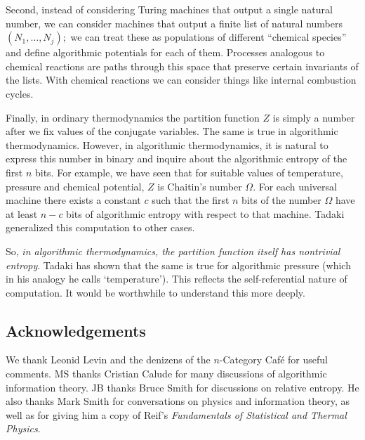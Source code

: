 \documentclass{article}
\begin{document}
Second, instead of considering Turing machines that output
a single natural number, we can consider machines that output a finite
list of natural numbers $(N_1, \ldots, N_j);$ we can treat these as
populations of different ``chemical species'' and define
algorithmic potentials for each of them.  Processes analogous to 
chemical reactions are paths through this space that preserve 
certain invariants of the lists.  With chemical reactions we can
consider things like internal combustion cycles.

Finally, in ordinary thermodynamics the partition function $Z$ is
simply a number after we fix values of the conjugate variables.  The
same is true in algorithmic thermodynamics.  However, in algorithmic
thermodynamics, it is natural to express this number in binary
and inquire about the algorithmic entropy of the first $n$ bits.  For
example, we have seen that for suitable values of temperature, 
pressure and chemical potential, $Z$ is Chaitin's number $\Omega$.  
For each universal machine there exists a constant $c$ such 
that the first $n$ bits of the number $\Omega$ have at least 
$n - c$ bits of algorithmic entropy with respect to that 
machine.  Tadaki \cite{Tadaki2002} generalized this computation to 
other cases.

So, \textit{in algorithmic thermodynamics, the partition
function itself has nontrivial entropy}.  Tadaki has shown that
the same is true for algorithmic pressure (which in his analogy
he calls `temperature').   This reflects the self-referential 
nature of computation.  It would be worthwhile to understand this 
more deeply.

\subsection*{Acknowledgements} 
We thank Leonid Levin and the denizens of the $n$-Category Caf\'e for
useful comments.  MS thanks Cristian Calude for many discussions 
of algorithmic information theory.  JB thanks Bruce Smith for 
discussions on relative entropy.  He also thanks Mark Smith for 
conversations on physics and information theory, as well as for 
giving him a copy of Reif's {\sl Fundamentals of Statistical and 
Thermal Physics}.  
\end{document}
